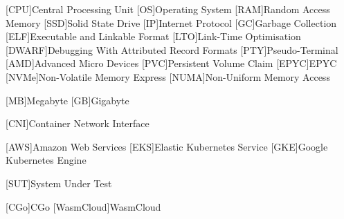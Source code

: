 [CPU]{Central Processing Unit}
[OS]{Operating System}
[RAM]{Random Access Memory}
[SSD]{Solid State Drive}
[IP]{Internet Protocol}
[GC]{Garbage Collection}
[ELF]{Executable and Linkable Format}
[LTO]{Link-Time Optimisation}
[DWARF]{Debugging With Attributed Record Formats}
[PTY]{Pseudo-Terminal}
[AMD]{Advanced Micro Devices}
[PVC]{Persistent Volume Claim}
[EPYC]{EPYC}
[NVMe]{Non-Volatile Memory Express}
[NUMA]{Non-Uniform Memory Access}

[MB]{Megabyte}
[GB]{Gigabyte}

[CNI]{Container Network Interface}

[AWS]{Amazon Web Services}
[EKS]{Elastic Kubernetes Service}
[GKE]{Google Kubernetes Engine}

[SUT]{System Under Test}

[CGo]{CGo}
[WasmCloud]{WasmCloud}
